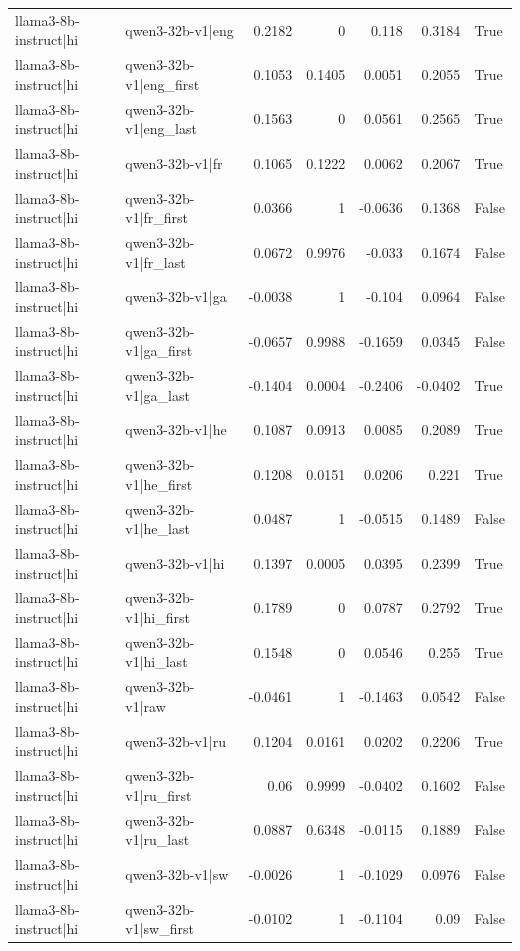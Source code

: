 \begin{table}
\begin{tabular}{l l r r r r l}
llama3-8b-instruct|hi & qwen3-32b-v1|eng & 0.2182 & 0 & 0.118 & 0.3184 & True \\
llama3-8b-instruct|hi & qwen3-32b-v1|eng_first & 0.1053 & 0.1405 & 0.0051 & 0.2055 & True \\
llama3-8b-instruct|hi & qwen3-32b-v1|eng_last & 0.1563 & 0 & 0.0561 & 0.2565 & True \\
llama3-8b-instruct|hi & qwen3-32b-v1|fr & 0.1065 & 0.1222 & 0.0062 & 0.2067 & True \\
llama3-8b-instruct|hi & qwen3-32b-v1|fr_first & 0.0366 & 1 & -0.0636 & 0.1368 & False \\
llama3-8b-instruct|hi & qwen3-32b-v1|fr_last & 0.0672 & 0.9976 & -0.033 & 0.1674 & False \\
llama3-8b-instruct|hi & qwen3-32b-v1|ga & -0.0038 & 1 & -0.104 & 0.0964 & False \\
llama3-8b-instruct|hi & qwen3-32b-v1|ga_first & -0.0657 & 0.9988 & -0.1659 & 0.0345 & False \\
llama3-8b-instruct|hi & qwen3-32b-v1|ga_last & -0.1404 & 0.0004 & -0.2406 & -0.0402 & True \\
llama3-8b-instruct|hi & qwen3-32b-v1|he & 0.1087 & 0.0913 & 0.0085 & 0.2089 & True \\
llama3-8b-instruct|hi & qwen3-32b-v1|he_first & 0.1208 & 0.0151 & 0.0206 & 0.221 & True \\
llama3-8b-instruct|hi & qwen3-32b-v1|he_last & 0.0487 & 1 & -0.0515 & 0.1489 & False \\
llama3-8b-instruct|hi & qwen3-32b-v1|hi & 0.1397 & 0.0005 & 0.0395 & 0.2399 & True \\
llama3-8b-instruct|hi & qwen3-32b-v1|hi_first & 0.1789 & 0 & 0.0787 & 0.2792 & True \\
llama3-8b-instruct|hi & qwen3-32b-v1|hi_last & 0.1548 & 0 & 0.0546 & 0.255 & True \\
llama3-8b-instruct|hi & qwen3-32b-v1|raw & -0.0461 & 1 & -0.1463 & 0.0542 & False \\
llama3-8b-instruct|hi & qwen3-32b-v1|ru & 0.1204 & 0.0161 & 0.0202 & 0.2206 & True \\
llama3-8b-instruct|hi & qwen3-32b-v1|ru_first & 0.06 & 0.9999 & -0.0402 & 0.1602 & False \\
llama3-8b-instruct|hi & qwen3-32b-v1|ru_last & 0.0887 & 0.6348 & -0.0115 & 0.1889 & False \\
llama3-8b-instruct|hi & qwen3-32b-v1|sw & -0.0026 & 1 & -0.1029 & 0.0976 & False \\
llama3-8b-instruct|hi & qwen3-32b-v1|sw_first & -0.0102 & 1 & -0.1104 & 0.09 & False \\

\end{tabular}
\end{table}

